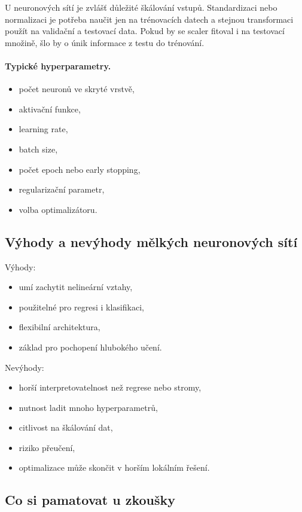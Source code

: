 U neuronových sítí je zvlášť důležité škálování vstupů. Standardizaci nebo normalizaci je potřeba naučit jen
na trénovacích datech a stejnou transformaci použít na validační a testovací data. Pokud by se scaler fitoval
i na testovací množině, šlo by o únik informace z testu do trénování.

\paragraph{Typické hyperparametry.}
\begin{itemize}
    \item počet neuronů ve skryté vrstvě,
    \item aktivační funkce,
    \item learning rate,
    \item batch size,
    \item počet epoch nebo early stopping,
    \item regularizační parametr,
    \item volba optimalizátoru.
\end{itemize}

\subsection{Výhody a nevýhody mělkých neuronových sítí}

Výhody:
\begin{itemize}
    \item umí zachytit nelineární vztahy,
    \item použitelné pro regresi i klasifikaci,
    \item flexibilní architektura,
    \item základ pro pochopení hlubokého učení.
\end{itemize}

Nevýhody:
\begin{itemize}
    \item horší interpretovatelnost než regrese nebo stromy,
    \item nutnost ladit mnoho hyperparametrů,
    \item citlivost na škálování dat,
    \item riziko přeučení,
    \item optimalizace může skončit v horším lokálním řešení.
\end{itemize}

\subsection{Co si pamatovat u zkoušky}

